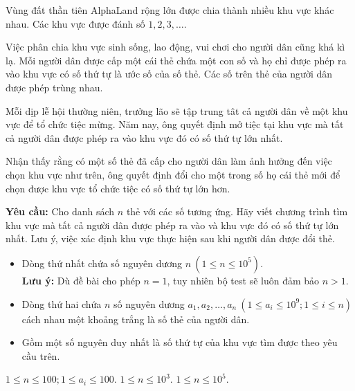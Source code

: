 
Vùng đất thần tiên AlphaLand rộng lớn được chia thành nhiều khu vực khác nhau. Các khu vực được đánh số $1,2,3,\dots$.

Việc phân chia khu vực sinh sống, lao động, vui chơi cho người dân cũng khá kì lạ. Mỗi người dân được cấp một cái thẻ chứa một con số và họ chỉ được phép ra vào khu vực có số thứ tự là ước số của số thẻ. Các số trên thẻ của người dân được phép trùng nhau.

Mỗi dịp lễ hội thường niên, trưởng lão sẽ tập trung tât cả người dân về một khu vực để tổ chức tiệc mừng. Năm nay, ông quyết định mở tiệc tại khu vực mà tất cả người dân được phép ra vào khu vực đó có số thứ tự lớn nhất.

Nhận thấy rằng có một số thẻ đã cấp cho người dân làm ảnh hưởng đến việc chọn khu vực như trên, ông quyết định đổi cho một trong số họ cái thẻ mới để chọn được khu vực tổ chức tiệc có số thứ tự lớn hơn.

\medskip
\textbf{Yêu cầu:} Cho danh sách $n$ thẻ với các số tương ứng. Hãy viết chương trình tìm khu vực mà tất cả người dân được phép ra vào và khu vực đó có số thứ tự lớn nhất. Lưu ý, việc xác định khu vực thực hiện sau khi người dân được đổi thẻ.

\begin{itemize}
    \item Dòng thứ nhất chứa số nguyên dương $n\ (1 \le n \le 10^{5})$. \\
    \small\noindent\textbf{Lưu ý:} Dù đề bài cho phép $n=1$, tuy nhiên bộ test sẽ luôn đảm bảo $n>1$.
    \item Dòng thứ hai chứa $n$ số nguyên dương $a_1, a_2, \dots, a_n\ (1 \le a_i \le 10^{9}; 1 \le i \le n)$ cách nhau một khoảng trắng là số thẻ của người dân.
\end{itemize}


\begin{itemize}
    \item Gồm một số nguyên duy nhất là số thứ tự của khu vực tìm được theo yêu cầu trên.
\end{itemize}

\begin{makesubtasks}
     $1 \le n \le 100; 1 \le a_i \le 100$.
     $1 \le n \le 10^{3}$.
     $1 \le n \le 10^{5}$.
\end{makesubtasks}


